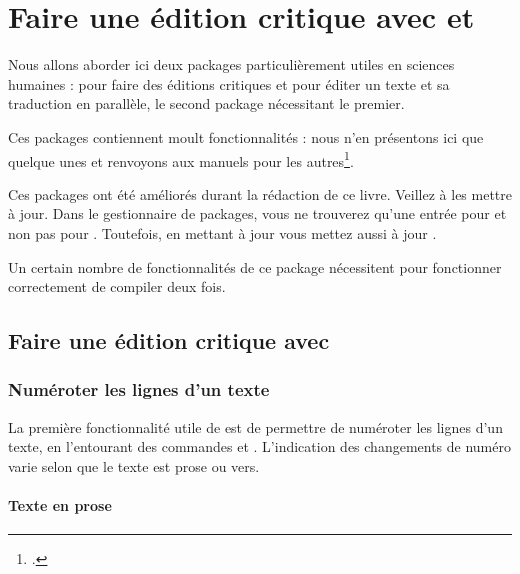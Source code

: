 \chapter{Faire une édition critique avec  et }  \label{ledmac}


\begin{prealable}
Nous allons aborder ici deux packages particulièrement utiles en sciences humaines :  pour faire des éditions critiques et  pour éditer un texte et sa traduction en parallèle, le second package nécessitant le premier.

Ces packages contiennent moult fonctionnalités : nous n'en présentons ici que quelque unes et renvoyons aux manuels pour les autres\footcites{ledmac}{ledpar}. 
\end{prealable}

\begin{attention}
Ces packages ont été améliorés durant la rédaction de ce livre. Veillez à les mettre à jour.
Dans le gestionnaire de packages, vous ne trouverez qu'une entrée pour   et non pas pour .  Toutefois, en mettant à jour  vous mettez aussi à jour  .
\end{attention}

\begin{attention}
Un certain nombre de fonctionnalités de ce package nécessitent pour fonctionner correctement de compiler deux fois.
\end{attention}



\section{Faire une édition critique avec }

\subsection{Numéroter les lignes d'un texte}

La première fonctionnalité utile de  est  de permettre  de numéroter les lignes d'un texte, en l'entourant des commandes  et . L'indication des changements de numéro varie selon que le texte est prose ou vers.

\subsubsection{Texte en prose}


